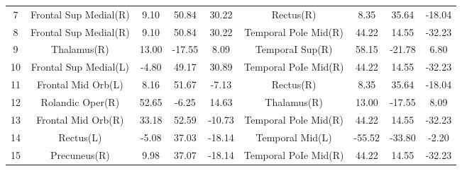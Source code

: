 \documentclass[journal,twoside,web]{ieeecolor}
\begin{document}
\begin{table}
\begin{tabular*}{\textwidth}{ccccccccc}
		7                            & Frontal Sup Medial(R)                      & 9.10   & 50.84  & 30.22                               & Rectus(R)                                           & 8.35   & 35.64  & -18.04                                             \\
		8                            & Frontal Sup Medial(R)                      & 9.10   & 50.84  & 30.22                               & Temporal Pole Mid(R)                                & 44.22  & 14.55  & -32.23                                             \\
		9                            & Thalamus(R)                                & 13.00  & -17.55 & 8.09                                & TemporaI Sup(R)                                     & 58.15  & -21.78 & 6.80                                               \\
		10                           & Frontal Sup Medial(L)                      & -4.80  & 49.17  & 30.89                               & Temporal PoIe Mid(R)                                & 44.22  & 14.55  & -32.23                                             \\
		11                           & Frontal Mid Orb(L)                         & 8.16   & 51.67  & -7.13                               & Rectus(R)                                           & 8.35   & 35.64  & -18.04                                             \\
		12                           & Rolandic Oper(R)                           & 52.65  & -6.25  & 14.63                               & Thalamus(R)                                         & 13.00  & -17.55 & 8.09                                               \\
		13                           & Frontal Mid Orb(R)                         & 33.18  & 52.59  & -10.73                              & Temporal Pole Mid(R)                                & 44.22  & 14.55  & -32.23                                             \\
		14                           & Rectus(L)                                  & -5.08  & 37.03  & -18.14                              & Temporal Mid(L)                                     & -55.52 & -33.80 & -2.20                                              \\
		15                           & Precuneus(R)                               & 9.98   & 37.07  & -18.14                              & Temporal PoIe Mid(R)                                & 44.22  & 14.55  & -32.23                                             \\

\end{tabular*}
\end{table}
\end{document}
